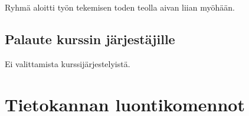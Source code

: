 \documentclass[a4paper,twoside,titlepage,12pt]{article}
\begin{document}
Ryhmä aloitti työn tekemisen toden teolla aivan liian myöhään.

\subsection{Palaute kurssin järjestäjille}

Ei valittamista kurssijärjestelyistä.

%
%
%
\newpage
\section*{Tietokannan luontikomennot}


\end{document}
